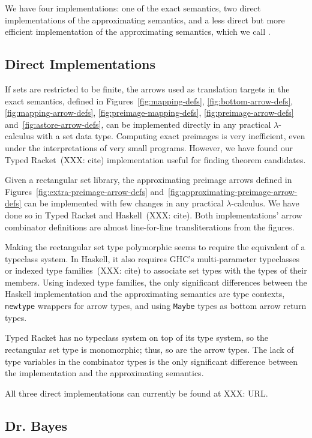 \documentclass[preprint]{sigplanconf}
\begin{document}
We have four implementations: one of the exact semantics, two direct implementations of the approximating semantics, and a less direct but more efficient implementation of the approximating semantics, which we call .

\subsection{Direct Implementations}

If sets are restricted to be finite, the arrows used as translation targets in the exact semantics, defined in Figures~\ref{fig:mapping-defs}, \ref{fig:bottom-arrow-defs}, \ref{fig:mapping-arrow-defs}, \ref{fig:preimage-mapping-defs}, \ref{fig:preimage-arrow-defs} and~\ref{fig:astore-arrow-defs}, can be implemented directly in any practical $\lambda$-calculus with a set data type.
Computing exact preimages is very inefficient, even under the interpretations of very small programs.
However, we have found our Typed Racket~(XXX: cite) implementation useful for finding theorem candidates.

Given a rectangular set library, the approximating preimage arrows defined in Figures~\ref{fig:extra-preimage-arrow-defs} and~\ref{fig:approximating-preimage-arrow-defs} can be implemented with few changes in any practical $\lambda$-calculus.
We have done so in Typed Racket and Haskell~(XXX: cite).
Both implementations' arrow combinator definitions are almost line-for-line transliterations from the figures.

Making the rectangular set type polymorphic seems to require the equivalent of a typeclass system.
In Haskell, it also requires GHC's multi-parameter typeclasses or indexed type families~(XXX: cite) to associate set types with the types of their members.
Using indexed type families, the only significant differences between the Haskell implementation and the approximating semantics are type contexts, \texttt{newtype} wrappers for arrow types, and using \texttt{Maybe} types as bottom arrow return types.

Typed Racket has no typeclass system on top of its type system, so the rectangular set type is monomorphic; thus, so are the arrow types.
The lack of type variables in the combinator types is the only significant difference between the implementation and the approximating semantics.

All three direct implementations can currently be found at XXX: URL.

\subsection{Dr. Bayes}
\end{document}
